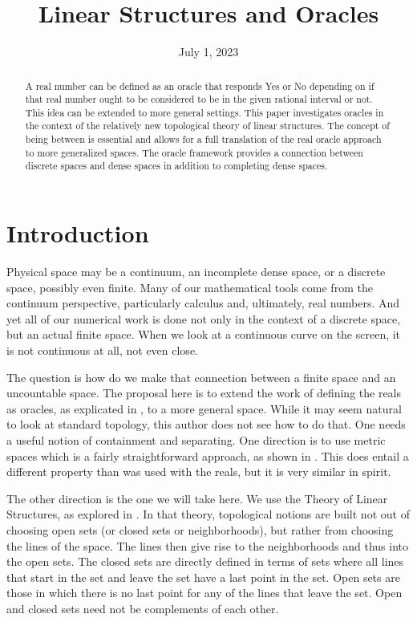 \documentclass[12pt]{article}
\title{Linear Structures and Oracles}
\date{July 1, 2023}
\begin{document}
\maketitle
\begin{abstract}
A real number can be defined as an oracle that responds Yes or No depending on if that real number ought to be considered to be in the given rational interval or not. This idea can be extended to more general settings. This paper investigates oracles in the context of the relatively new topological theory of linear structures. The concept of being between is essential and allows for a full translation of the real oracle approach to more generalized spaces. The oracle framework provides a connection between discrete spaces and dense spaces in addition to completing dense spaces. 
\end{abstract}

\section{Introduction}

Physical space may be a continuum, an incomplete dense space, or a discrete space, possibly even finite. Many of our mathematical tools come from the continuum perspective, particularly calculus and, ultimately, real numbers. And yet all of our numerical work is done not only in the context of a discrete space, but an actual finite space. When we look at a continuous curve on the screen, it is not continuous at all, not even close. 

The question is how do we make that connection between a finite space and an uncountable space. The proposal here is to extend the work of defining the reals as oracles, as explicated in \cite{taylor23main}, to a more general space. While it may seem natural to look at standard topology, this author does not see how to do that. One needs a useful notion of containment and separating. One direction is to use metric spaces which is a fairly straightforward approach, as shown in \cite{taylor23metric}. This does entail a different property than was used with the reals, but it is very similar in spirit. 

The other direction is the one we will take here. We use the Theory of Linear Structures, as explored in \cite{maudlin}. In that theory, topological notions are built not out of choosing open sets (or closed sets or neighborhoods), but rather from choosing the lines of the space. The lines then give rise to the neighborhoods and thus into the open sets. The closed sets are directly defined in terms of sets where all lines that start in the set and leave the set have a last point in the set. Open sets are those in which there is no last point for any of the lines that leave the set. Open and closed sets need not be complements of each other. 
\end{document}
